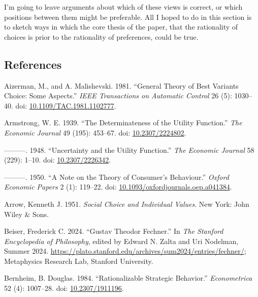 \documentclass[
  11pt,
  letterpaper,
  DIV=11,
  numbers=noendperiod,
  twoside]{scrartcl}
\newlength{\cslhangindent}
\newenvironment{CSLReferences}[2] %
 {\begin{list}{}{%
  \setlength{\itemindent}{0pt}
  \setlength{\leftmargin}{0pt}
  \setlength{\parsep}{0pt}
  \ifodd #1
   \setlength{\leftmargin}{\cslhangindent}
   \setlength{\itemindent}{-1\cslhangindent}
  \fi
  \setlength{\itemsep}{#2\baselineskip}}}
 {\end{list}}
\begin{document}
I'm going to leave arguments about which of these views is correct, or
which positions between them might be preferable. All I hoped to do in
this section is to sketch ways in which the core thesis of the paper,
that the rationality of choices is prior to the rationality of
preferences, could be true.

\subsection*{References}\label{references}

\label{refs}
\begin{CSLReferences}{1}{0}
Aizerman, M., and A. Malishevski. 1981. {``General Theory of Best
Variants Choice: Some Aspects.''} \emph{IEEE Transactions on Automatic
Control} 26 (5): 1030--40. doi:
\href{https://doi.org/10.1109/TAC.1981.1102777}{10.1109/TAC.1981.1102777}.

Armstrong, W. E. 1939. {``The Determinateness of the Utility
Function.''} \emph{The Economic Journal} 49 (195): 453--67. doi:
\href{https://doi.org/10.2307/2224802}{10.2307/2224802}.

---------. 1948. {``Uncertainty and the Utility Function.''} \emph{The
Economic Journal} 58 (229): 1--10. doi:
\href{https://doi.org/10.2307/2226342}{10.2307/2226342}.

---------. 1950. {``A Note on the Theory of Consumer's Behaviour.''}
\emph{Oxford Economic Papers} 2 (1): 119--22. doi:
\href{https://doi.org/10.1093/oxfordjournals.oep.a041384}{10.1093/oxfordjournals.oep.a041384}.

Arrow, Kenneth J. 1951. \emph{Social Choice and Individual Values}. New
York: John Wiley \& Sons.

Beiser, Frederick C. 2024. {``{Gustav Theodor Fechner}.''} In \emph{The
{Stanford} Encyclopedia of Philosophy}, edited by Edward N. Zalta and
Uri Nodelman, {S}ummer 2024.
\url{https://plato.stanford.edu/archives/sum2024/entries/fechner/};
Metaphysics Research Lab, Stanford University.

Bernheim, B. Douglas. 1984. {``Rationalizable Strategic Behavior.''}
\emph{Econometrica} 52 (4): 1007--28. doi:
\href{https://doi.org/10.2307/1911196}{10.2307/1911196}.


\end{CSLReferences}
\end{document}
